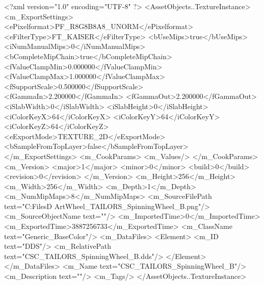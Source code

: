 <?xml version="1.0" encoding="UTF-8" ?>
<AssetObjects..TextureInstance>
	<m_ExportSettings>
		<ePixelformat>PF_R8G8B8A8_UNORM</ePixelformat>
		<eFilterType>FT_KAISER</eFilterType>
		<bUseMips>true</bUseMips>
		<iNumManualMips>0</iNumManualMips>
		<bCompleteMipChain>true</bCompleteMipChain>
		<fValueClampMin>0.000000</fValueClampMin>
		<fValueClampMax>1.000000</fValueClampMax>
		<fSupportScale>0.500000</fSupportScale>
		<fGammaIn>2.200000</fGammaIn>
		<fGammaOut>2.200000</fGammaOut>
		<iSlabWidth>0</iSlabWidth>
		<iSlabHeight>0</iSlabHeight>
		<iColorKeyX>64</iColorKeyX>
		<iColorKeyY>64</iColorKeyY>
		<iColorKeyZ>64</iColorKeyZ>
		<eExportMode>TEXTURE_2D</eExportMode>
		<bSampleFromTopLayer>false</bSampleFromTopLayer>
	</m_ExportSettings>
	<m_CookParams>
		<m_Values/>
	</m_CookParams>
	<m_Version>
		<major>1</major>
		<minor>0</minor>
		<build>0</build>
		<revision>0</revision>
	</m_Version>
	<m_Height>256</m_Height>
	<m_Width>256</m_Width>
	<m_Depth>1</m_Depth>
	<m_NumMipMaps>8</m_NumMipMaps>
	<m_SourceFilePath text="C:\Users\Shadow\Desktop\Working Files\3D Art\Props\Tailors\Spinning Wheel\CSC_TAILORS_SpinningWheel_B.png"/>
	<m_SourceObjectName text=""/>
	<m_ImportedTime>0</m_ImportedTime>
	<m_ExportedTime>3887256733</m_ExportedTime>
	<m_ClassName text="Generic_BaseColor"/>
	<m_DataFiles>
		<Element>
			<m_ID text="DDS"/>
			<m_RelativePath text="CSC_TAILORS_SpinningWheel_B.dds"/>
		</Element>
	</m_DataFiles>
	<m_Name text="CSC_TAILORS_SpinningWheel_B"/>
	<m_Description text=""/>
	<m_Tags/>
</AssetObjects..TextureInstance>

